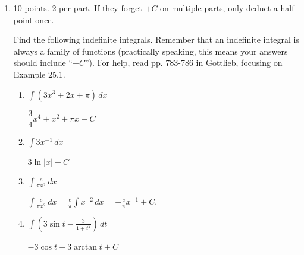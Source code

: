 \documentclass{article}
\begin{document}
\begin{enumerate}
\item 

\begin{grading}
10 points. 2 per part. If they forget $+C$ on multiple parts, only deduct a half point once.
\end{grading}

  Find the following indefinite
  integrals.  Remember that an indefinite integral is always a family of
  functions (practically speaking, this means your answers should include
  ``$ + C$''). For help, read pp. 783-786 in Gottlieb, focusing on Example 25.1.

  \probonly{}
    \begin{enumerate}
    \item
      \begin{problem}[\vfill]
        $\displaystyle \int (3x^3 +2x +\pi)\,dx$
      \end{problem}

      \begin{solution}
        $\dfrac{3}{4}x^4+x^2+\pi x+C$
      \end{solution}

    \item 
      \begin{problem}[\vfill]
        $\displaystyle \int 3x^{-1} \,dx$
      \end{problem}

      \begin{solution}
        $3\ln |x| + C$
      \end{solution}

    \item
      \begin{problem}[\vfill]
        $\displaystyle \int \frac{e}{\pi x^2}\,dx$
      \end{problem}

      \begin{solution}
        $\displaystyle \int \frac{e}{\pi x^2}\,dx = \frac{e}{\pi} \int
        x^{-2}\,dx = \boxed{- \frac{e}{\pi} x^{-1} + C}$. 
      \end{solution}

    \item
      \begin{problem}[\nstretch{1}]
        $\displaystyle \int \left( 3\sin t -\frac{3}{1+t^2} \right)\,dt$
      \end{problem}

      \begin{solution}
        $-3\cos t -3\arctan t + C$
      \end{solution}


\end{enumerate}
\end{enumerate}
\end{document}
